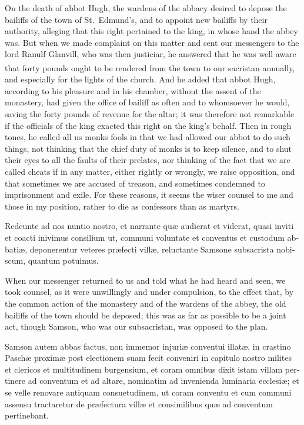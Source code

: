 \documentclass{book}
\newcounter{engnote}
\newcommand{\engnotenum}{\textsuperscript{\arabic{engnote}\stepcounter{engnote}}}
\begin{document}
\begin{paracol}{2}
On the death of abbot Hugh, the wardens of the abbacy desired to depose the bailiffs of the town of St.\ Edmund's, and to appoint new bailiffs by their authority, alleging that this right pertained to the king, in whose hand the abbey was. But when we made complaint on this matter and sent our messengers to the lord Ranulf Glanvill, who was then justiciar, he answered that he was well aware that forty pounds ought to be rendered from the town\engnotenum{} to our sacristan annually, and especially for the lights of the church. And he added that abbot Hugh, according to his pleasure and in his chamber, without the assent of the monastery, had given the office of bailiff as often and to whomsoever he would, saving the forty pounds of revenue for the altar; it was therefore not remarkable if the officials of the king exacted this right on the king's behalf. Then in rough tones, he called all us monks fools in that we had allowed our abbot to do such things, not thinking that the chief duty of monks is to keep silence, and to shut their eyes to all the faults of their prelates, nor thinking of the fact that we are called cheats if in any matter, either rightly or wrongly, we raise opposition, and that sometimes we are accused of treason, and sometimes condemned to imprisonment and exile. For these reasons, it seems the wiser counsel to me and those in my position, rather to die as confessors than as martyrs.

\switchcolumn*

\begin{otherlanguage}{latin}
Redeunte ad nos nuntio nostro, et narrante qu\ae{} audierat et viderat, quasi inviti et coacti inivimus consilium ut, communi voluntate et conventus et custodum abbati\ae{}, deponerentur veteres pr\ae{}fecti vill\ae{}, reluctante Samsone subsacrista nobiscum, quantum potuimus.
\end{otherlanguage}

\switchcolumn

When our messenger returned to us and told what he had heard and seen, we took counsel, as it were unwillingly and under compulsion, to the effect that, by the common action of the monastery and of the wardens of the abbey, the old bailiffs of the town should be deposed; this was as far as possible to be a joint act, though Samson, who was our subsacristan, was opposed to the plan.

\switchcolumn*

\begin{otherlanguage}{latin}
Samson autem abbas factus, non immemor injuri\ae{} conventui illat\ae{}, in crastino Pasch\ae{} proxim\ae{} post electionem suam fecit conveniri in capitulo nostro milites et clericos et multitudinem burgensium, et coram omnibus dixit istam villam pertinere ad conventum et ad altare, nominatim ad invenienda luminaria ecclesi\ae{}; et se velle renovare antiquam consuetudinem, ut coram conventu et cum communi assensu tractaretur de pr\ae{}fectura vill\ae{} et consimilibus qu\ae{} ad conventum pertinebant. 
\end{otherlanguage}


\end{paracol}
\end{document}
